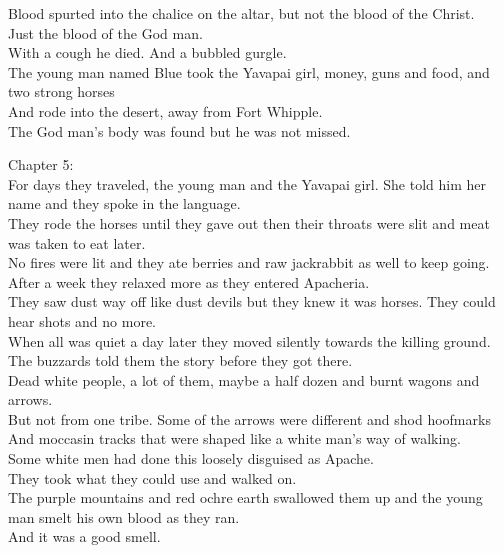 Blood spurted into the chalice on the altar, but not the blood of the Christ. \\
Just the blood of the God man. \\

With a cough he died. And a bubbled gurgle. \\

The young man named Blue took the Yavapai girl, money, guns and food, and two strong horses \\
And rode into the desert, away from Fort Whipple. \\
The God man's body was found but he was not missed. \\




Chapter 5: \\

For days they traveled, the young man and the Yavapai girl. She told him her name and they spoke in the language. \\
They rode the horses until they gave out then their throats were slit and meat was taken to eat later. \\
No fires were lit and they ate berries and raw jackrabbit as well to keep going. \\
After a week they relaxed more as they entered Apacheria. \\

They saw dust way off like dust devils but they knew it was horses. They could hear shots and no more. \\
When all was quiet a day later they moved silently towards the killing ground. \\

The buzzards told them the story before they got there. \\
Dead white people, a lot of them, maybe a half dozen and burnt wagons and arrows. \\
But not from one tribe. Some of the arrows were different and shod hoofmarks \\
And moccasin tracks that were shaped like a white man's way of walking. \\
Some white men had done this loosely disguised as Apache. \\

They took what they could use and walked on. \\
The purple mountains and red ochre earth swallowed them up and the young man smelt his own blood as they ran. \\
And it was a good smell. \\

